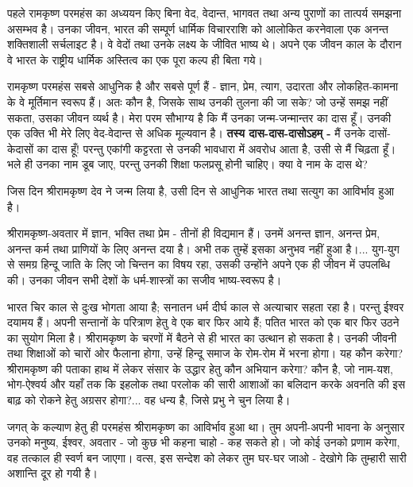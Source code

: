 पहले रामकृष्ण परमहंस का अध्ययन किए बिना वेद, वेदान्त, भागवत तथा अन्य पुराणों का तात्पर्य समझना असम्भव है। उनका जीवन, भारत की सम्पूर्ण धार्मिक विचारराशि को आलोकित करनेवाला एक अनन्त शक्तिशाली सर्चलाइट है। वे वेदों तथा उनके लक्ष्य के जीवित भाष्य थे। अपने एक जीवन काल के दौरान वे भारत के राष्ट्रीय धार्मिक अस्तित्व का एक पूरा कल्प ही बिता गये। 

रामकृष्ण परमहंस सबसे आधुनिक है और सबसे पूर्ण हैं - ज्ञान, प्रेम, त्याग, उदारता और लोकहित-कामना के वे मूर्तिमान स्वरूप हैं। अतः कौन है, जिसके साथ उनकी तुलना की जा सके? जो उन्हें समझ नहीं सकता, उसका जीवन व्यर्थ है। मेरा परम सौभाग्य है कि मैं उनका जन्म-जन्मान्तर का दास हूँ। उनकी एक उक्ति भी मेरे लिए वेद-वेदान्त से अधिक मूल्यवान है। \textbf{तस्य दास-दास-दासोऽहम् - } मैं उनके दासों-केदासों का दास हूँ! परन्तु एकांगी कट्टरता से उनकी भावधारा में अवरोध आता है, उसी से मैं चिढ़ता हूँ। भले ही उनका नाम डूब जाए, परन्तु उनकी शिक्षा फलप्रसू होनी चाहिए। क्या वे नाम के दास थे? 

जिस दिन श्रीरामकृष्ण देव ने जन्म लिया है, उसी दिन से आधुनिक भारत तथा सत्युग का आविर्भाव हुआ है। 

श्रीरामकृष्ण-अवतार में ज्ञान, भक्ति तथा प्रेम - तीनों ही विद्यमान हैं। उनमें अनन्त ज्ञान, अनन्त प्रेम, अनन्त कर्म तथा प्राणियों के लिए अनन्त दया है। अभी तक तुम्हें इसका अनुभव नहीं हुआ है।... युग-युग से समग्र हिन्दू जाति के लिए जो चिन्तन का विषय रहा, उसकी उन्होंने अपने एक ही जीवन में उपलब्धि की। उनका जीवन सभी देशों के धर्म-शास्त्रों का सजीव भाष्य-स्वरूप है। 

भारत चिर काल से दुःख भोगता आया है; सनातन धर्म दीर्घ काल से अत्याचार सहता रहा है। परन्तु ईश्वर दयामय हैं। अपनी सन्तानों के परित्राण हेतु वे एक बार फिर आये हैं; पतित भारत को एक बार फिर उठने का सुयोग मिला है। श्रीरामकृष्ण के चरणों में बैठने से ही भारत का उत्थान हो सकता है। उनकी जीवनी तथा शिक्षाओं को चारों ओर फैलाना होगा, उन्हें हिन्दू समाज के रोम-रोम में भरना होगा। यह कौन करेगा? श्रीरामकृष्ण की पताका हाथ में लेकर संसार के उद्धार हेतु कौन अभियान करेगा? कौन है, जो नाम-यश, भोग-ऐश्वर्य और यहाँ तक कि इहलोक तथा परलोक की सारी आशाओं का बलिदान करके अवनति की इस बाढ़ को रोकने हेतु अग्रसर होगा?... वह धन्य है, जिसे प्रभु ने चुन लिया है। 

जगत् के कल्याण हेतु ही परमहंस श्रीरामकृष्ण का आविर्भाव हुआ था। तुम अपनी-अपनी भावना के अनुसार उनको मनुष्य, ईश्वर, अवतार - जो कुछ भी कहना चाहो - कह सकते हो। जो कोई उनको प्रणाम करेगा, वह तत्काल ही स्वर्ण बन जाएगा। वत्स, इस सन्देश को लेकर तुम घर-घर जाओ - देखोगे कि तुम्हारी सारी अशान्ति दूर हो गयी है। 

